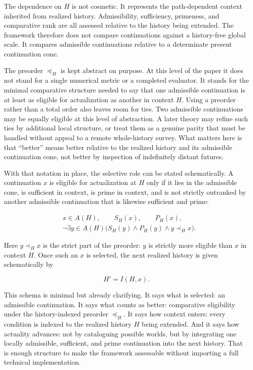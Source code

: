 \documentclass[11pt]{article}
\theoremstyle{foundation}
\begin{document}
The dependence on $H$ is not cosmetic. It represents the path-dependent context inherited from realized history. Admissibility, sufficiency, primeness, and comparative rank are all assessed relative to the history being extended. The framework therefore does not compare continuations against a history-free global scale. It compares admissible continuations relative to a determinate present continuation cone.

The preorder $\preceq_H$ is kept abstract on purpose. At this level of the paper it does not stand for a single numerical metric or a completed evaluator. It stands for the minimal comparative structure needed to say that one admissible continuation is at least as eligible for actualization as another in context $H$. Using a preorder rather than a total order also leaves room for ties. Two admissible continuations may be equally eligible at this level of abstraction. A later theory may refine such ties by additional local structure, or treat them as a genuine parity that must be handled without appeal to a remote whole-history survey. What matters here is that ``better'' means better relative to the realized history and its admissible continuation cone, not better by inspection of indefinitely distant futures.

With that notation in place, the selective role can be stated schematically. A continuation $x$ is eligible for actualization at $H$ only if it lies in the admissible cone, is sufficient in context, is prime in context, and is not strictly outranked by another admissible continuation that is likewise sufficient and prime:

\[
\begin{aligned}
&x \in A(H), \qquad S_H(x), \qquad P_H(x),\\
&\neg \exists y \in A(H)\bigl(S_H(y) \wedge P_H(y) \wedge y \prec_H x\bigr).
\end{aligned}
\]

Here $y \prec_H x$ is the strict part of the preorder: $y$ is strictly more eligible than $x$ in context $H$. Once such an $x$ is selected, the next realized history is given schematically by

\[
H' = I(H,x).
\]

This schema is minimal but already clarifying. It says what is selected: an admissible continuation. It says what counts as better: comparative eligibility under the history-indexed preorder $\preceq_H$. It says how context enters: every condition is indexed to the realized history $H$ being extended. And it says how actuality advances: not by cataloguing possible worlds, but by integrating one locally admissible, sufficient, and prime continuation into the next history. That is enough structure to make the framework assessable without importing a full technical implementation.
\end{document}
